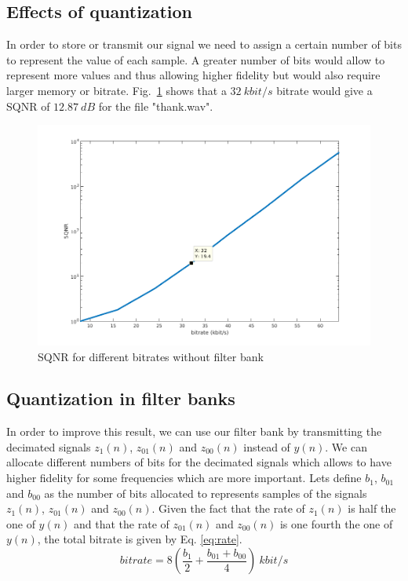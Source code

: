 \documentclass[a4paper,twocolumn]{article}
\begin{document}
\subsection{Effects of quantization}
\label{sec:quantizationeffect}
In order to store or transmit our signal we need to assign a certain number of bits to represent the value of each sample. A greater number of bits would allow to represent more values and thus allowing higher fidelity but would also require larger memory or bitrate. Fig.~\ref{fig:quant} shows that a $32~kbit/s$ bitrate would give a SQNR of $12.87~dB$ for the file "thank.wav".

\begin{figure}[!ht]
  \begin{center}
    \includegraphics[width=1.1\columnwidth]{quantization.png}
  \end{center}
  \caption{SQNR for different bitrates without filter bank}
  \label{fig:quant}
\end{figure}

\subsection{Quantization in filter banks}
In order to improve this result, we can use our filter bank by transmitting the decimated signals $z_{1}(n)$, $z_{01}(n)$ and $z_{00}(n)$ instead of $y(n)$. We can allocate different numbers of bits for the decimated signals which allows to have higher fidelity for some frequencies which are more important.
Lets define $b_{1}$, $b_{01}$ and $b_{00}$ as the number of bits allocated to represents samples of the signals $z_{1}(n)$, $z_{01}(n)$ and $z_{00}(n)$.
Given the fact that the rate of $z_{1}(n)$ is half the one of $y(n)$ and that the rate of $z_{01}(n)$ and $z_{00}(n)$ is one fourth the one of $y(n)$, the total bitrate is given by Eq. \ref{eq:rate}.
\begin{equation}
  \label{eq:rate}
  bitrate = 8(\frac{b_{1}}{2}+\frac{b_{01}+b_{00}}{4})~kbit/s
\end{equation}
\end{document}
